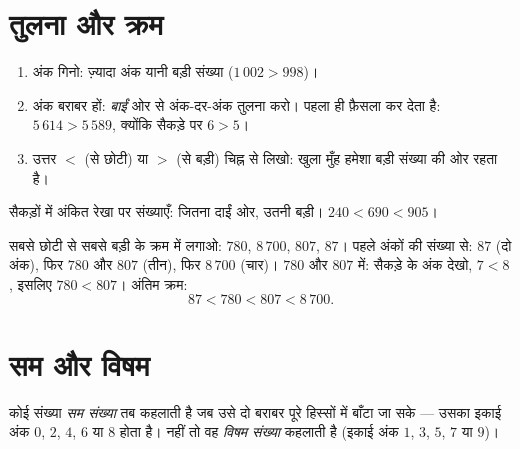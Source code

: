 \section{तुलना और क्रम}

\begin{method}[दो संख्याओं की तुलना]\label{met:g3:numbers:compare}
\begin{enumerate}
  \item अंक गिनो: ज़्यादा अंक यानी बड़ी संख्या
        ($1\,002 > 998$)।
  \item अंक बराबर हों: \emph{बाईं} ओर से अंक-दर-अंक तुलना करो।
        पहला  ही फ़ैसला कर देता है:
        $5\,614 > 5\,589$, क्योंकि सैकड़े पर $6 > 5$।
  \item उत्तर $<$ (से छोटी) या $>$ (से बड़ी) चिह्न से लिखो:
        खुला मुँह हमेशा बड़ी संख्या की ओर रहता है।
\end{enumerate}
\end{method}

\begin{omfigure}

{\small सैकड़ों में अंकित रेखा पर संख्याएँ: जितना दाईं ओर, उतनी
बड़ी। $240 < 690 < 905$।}
\end{omfigure}

\begin{example}\label{ex:g3:numbers:order}
सबसे छोटी से सबसे बड़ी के क्रम में लगाओ: $780$, $8\,700$, $807$, $87$।
पहले अंकों की संख्या से: $87$ (दो अंक), फिर $780$ और $807$
(तीन), फिर $8\,700$ (चार)। $780$ और $807$ में: सैकड़े के अंक
देखो, $7 < 8$, इसलिए $780 < 807$। अंतिम क्रम:
\[
87 < 780 < 807 < 8\,700 .
\]
\end{example}

\section{सम और विषम}

\begin{definition}[सम, विषम]\label{def:g3:numbers:evenodd}
कोई संख्या \emph{सम संख्या} तब कहलाती है जब उसे
दो बराबर पूरे हिस्सों में बाँटा जा सके --- उसका इकाई अंक $0$, $2$,
$4$, $6$ या $8$ होता है। नहीं तो वह
\emph{विषम संख्या} कहलाती है (इकाई अंक $1$,
$3$, $5$, $7$ या $9$)।
\end{definition}

